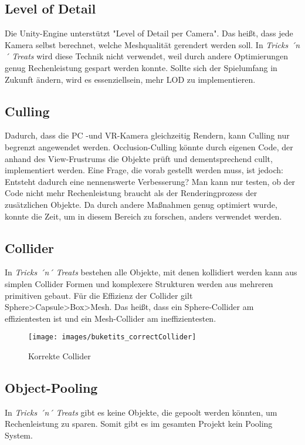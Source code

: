 \subsection{Level of Detail}
Die Unity-Engine unterstützt "Level of Detail per Camera". Das heißt, dass jede Kamera selbst berechnet, welche Meshqualität gerendert werden soll. In \emph{Tricks ´n´ Treats} wird diese Technik nicht verwendet, weil durch andere Optimierungen genug Rechenleistung gespart werden konnte. Sollte sich der Spielumfang in Zukunft ändern, wird es essenziellsein, mehr LOD zu implementieren.

\subsection{Culling}
Dadurch, dass die PC -und VR-Kamera gleichzeitig Rendern, kann Culling nur begrenzt angewendet werden. Occlusion-Culling könnte durch eigenen Code, der anhand des View-Frustrums die Objekte prüft und dementsprechend cullt, implementiert werden. Eine Frage, die vorab gestellt werden muss, ist jedoch: Entsteht dadurch eine nennenswerte Verbesserung? Man kann nur testen, ob der Code nicht mehr Rechenleistung braucht als der Renderingprozess der zusätzlichen Objekte. Da durch andere Maßnahmen genug optimiert wurde, konnte die Zeit, um in diesem Bereich zu forschen, anders verwendet werden.

\subsection{Collider}
In \emph{Tricks ´n´ Treats} bestehen alle Objekte, mit denen kollidiert werden kann aus simplen Collider Formen und komplexere Strukturen werden aus mehreren primitiven gebaut. 
Für die Effizienz der Collider gilt Sphere>Capsule>Box>Mesh. Das heißt, dass ein Sphere-Collider am effizientesten ist und ein Mesh-Collider am ineffizientesten.

\begin{figure}[H]
	\centering
	\texttt{[image: images/buketits\_correctCollider]}
	\caption{Korrekte Collider}
\end{figure}

\subsection{Object-Pooling}
In \emph{Tricks ´n´ Treats} gibt es keine Objekte, die gepoolt werden könnten, um Rechenleistung zu sparen. Somit gibt es im gesamten Projekt kein Pooling System.

